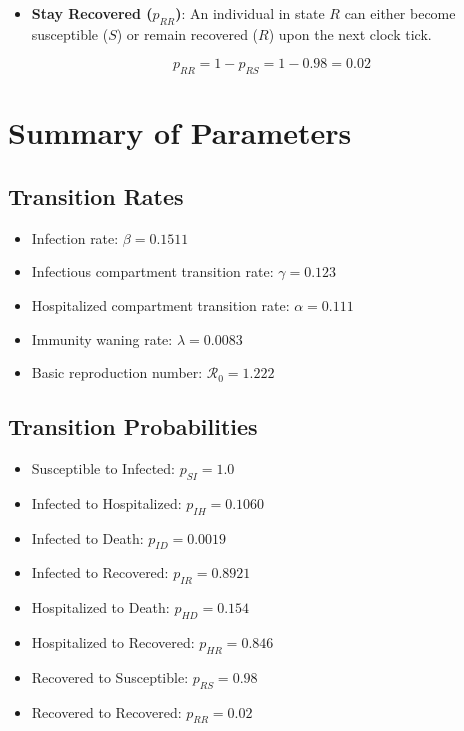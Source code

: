 \documentclass[11pt]{article}
\begin{document}
\begin{itemize}
    \[
    p_{RS} = 0.98
    \]

    This high value ensures that most individuals whose immunity wanes become fully susceptible again.

    \item \textbf{Stay Recovered ($p_{RR}$)}: An individual in state $R$ can either become susceptible ($S$) or remain recovered ($R$) upon the next clock tick.

    \[
    p_{RR} = 1 - p_{RS} = 1 - 0.98 = 0.02
    \]

\end{itemize}

\section{Summary of Parameters}

\subsection{Transition Rates}
\begin{itemize}
    \item Infection rate: $\beta = 0.1511$
    \item Infectious compartment transition rate: $\gamma = 0.123$
    \item Hospitalized compartment transition rate: $\alpha = 0.111$
    \item Immunity waning rate: $\lambda = 0.0083$
    \item Basic reproduction number: $\mathcal{R}_0 = 1.222$
\end{itemize}

\subsection{Transition Probabilities}
\begin{itemize}
    \item Susceptible to Infected: $p_{SI} = 1.0$
    \item Infected to Hospitalized: $p_{IH} = 0.1060$
    \item Infected to Death: $p_{ID} = 0.0019$
    \item Infected to Recovered: $p_{IR} = 0.8921$
    \item Hospitalized to Death: $p_{HD} = 0.154$
    \item Hospitalized to Recovered: $p_{HR} = 0.846$
    \item Recovered to Susceptible: $p_{RS} = 0.98$
    \item Recovered to Recovered: $p_{RR} = 0.02$
\end{itemize}
\end{document}
